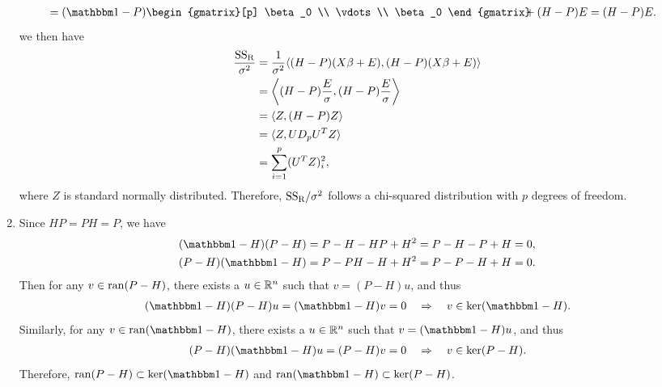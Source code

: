 \begin{enumerate}
\begin{align*}
	& = (\bbone - P)\begin{gmatrix}[p]
	\beta_0  \\
	\vdots  \\
	\beta_0 
	\end{gmatrix}\!\!\!\! + (H-P)E = (H-P)E.
	\end{align*}
	we then have
	\begin{align*}
	\frac{\mathrm{SS_R}}{\sigma^2} & = \frac{1}{\sigma^2}\langle (H-P)(X\beta + E), (H-P)(X\beta + E)\rangle \\
	& =  \left\langle (H-P)\frac{E}{\sigma}, (H-P)\frac{E}{\sigma}\right\rangle \\
	& = \langle Z, (H-P)Z\rangle \\
	& = \langle Z, UD_pU^T Z\rangle  \\
	& = \sum_{i=1}^{p} (U^TZ)_i^2,
	\end{align*}
	where $Z$ is standard normally distributed. Therefore, $\mathrm{SS_R}/\sigma^2$ follows a chi-squared distribution with $p$ degrees of freedom.
	\item Since $HP = PH = P$, we have
	\begin{align*}
	(\bbone - H)(P - H) & = P - H - HP + H^2 = P - H - P + H = 0, \\
	(P - H)(\bbone - H) & = P - PH - H + H^2 = P - P - H + H = 0.
	\end{align*}
	Then for any $v\in \mathrm{ran}(P - H)$, there exists a $u\in \mathbb{R}^n$ such that $v = (P-H)u$, and thus
	\begin{align*}
	(\bbone - H)(P - H)u = (\bbone - H)v = 0\quad\Rightarrow\quad v\in \U{ker}(\bbone - H).
	\end{align*}
	Similarly, for any $v\in \U{ran}(\bbone - H)$, there exists a $u\in \mathbb{R}^n$ such that $v = (\bbone - H)u$, and thus
	\begin{align*}
	(P - H)(\bbone - H)u = (P - H)v = 0\quad\Rightarrow\quad v\in \U{ker}(P - H).
	\end{align*}
	Therefore, $\U{ran}(P - H)\subset\U{ker}(\bbone - H)$ and $\U{ran}(\bbone - H)\subset \U{ker}(P - H)$.
\end{enumerate}